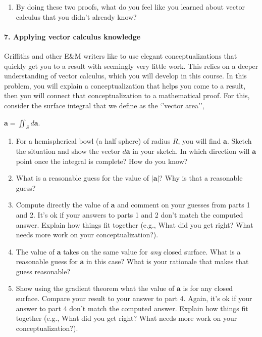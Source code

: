 \documentclass[
  letterpaperpaper,
]{article}
\providecommand{\tightlist}{%
  \setlength{\itemsep}{0pt}\setlength{\parskip}{0pt}}
\begin{document}
\begin{enumerate}
\def\labelenumi{\arabic{enumi}.}
\setcounter{enumi}{2}
\tightlist
\item
  By doing these two proofs, what do you feel like you learned about
  vector calculus that you didn't already know?
\end{enumerate}

\hypertarget{applying-vector-calculus-knowledge}{%
\paragraph{7. Applying vector calculus
knowledge}\label{applying-vector-calculus-knowledge}}

Griffiths and other E\&M writers like to use elegant conceptualizations
that quickly get you to a result with seemingly very little work. This
relies on a deeper understanding of vector calculus, which you will
develop in this course. In this problem, you will explain a
conceptualization that helps you come to a result, then you will connect
that conceptualization to a mathematical proof. For this, consider the
surface integral that we define as the `'vector area'',

\(\mathbf{a} = \iint_S d\mathbf{a}\).

\begin{enumerate}
\def\labelenumi{\arabic{enumi}.}
\tightlist
\item
  For a hemispherical bowl (a half sphere) of radius \(R\), you will
  find \(\mathbf{a}\). Sketch the situation and show the vector
  \(d\mathbf{a}\) in your sketch. In which direction will \(\mathbf{a}\)
  point once the integral is complete? How do you know?
\item
  What is a reasonable guess for the value of \(\vert\mathbf{a}\vert\)?
  Why is that a reasonable guess?
\item
  Compute directly the value of \(\mathbf{a}\) and comment on your
  guesses from parts 1 and 2. It's ok if your answers to parts 1 and 2
  don't match the computed answer. Explain how things fit together
  (e.g., What did you get right? What needs more work on your
  conceptualization?).
\item
  The value of \(\mathbf{a}\) takes on the same value for \emph{any}
  closed surface. What is a reasonable guess for \(\mathbf{a}\) in this
  case? What is your rationale that makes that guess reasonable?
\item
  Show using the gradient theorem what the value of \(\mathbf{a}\) is
  for any closed surface. Compare your result to your answer to part 4.
  Again, it's ok if your answer to part 4 don't match the computed
  answer. Explain how things fit together (e.g., What did you get right?
  What needs more work on your conceptualization?).
\end{enumerate}
\end{document}
